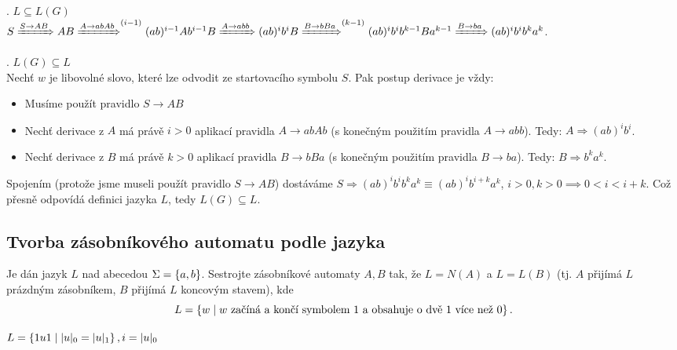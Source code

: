. $L \subseteq L(G)$\\
$S \xRightarrow{S \rightarrow AB} AB \xRightarrow{A \rightarrow abAb}^{(i-1)} (ab)^{i-1} A b^{i-1} B \xRightarrow{A \rightarrow abb}
(ab)^i b^i B \xRightarrow{B \rightarrow bBa}^{(k-1)} (ab)^i b^i b^{k-1} B a^{k-1} \xRightarrow{B \rightarrow ba} (ab)^i b^i b^k a^k$.

. $L(G) \subseteq L$\\
Nechť $w$ je libovolné slovo, které lze odvodit ze startovacího symbolu $S$. Pak postup derivace je vždy:
\begin{itemize}
    \item Musíme použít pravidlo $S \rightarrow AB$
    \item Nechť derivace z $A$ má právě $i > 0$ aplikací pravidla $A \rightarrow abAb$ (s konečným použitím pravidla 
    $A \rightarrow abb$). Tedy: $A \Rightarrow (ab)^i b^i$.
    \item Nechť derivace z $B$ má právě $k > 0$ aplikací pravidla $B \rightarrow bBa$ (s konečným použitím pravidla
    $B \rightarrow ba$). Tedy: $B \Rightarrow b^k a^k$.
\end{itemize}
Spojením (protože jsme museli použít pravidlo $S \rightarrow AB$) dostáváme $S \Rightarrow (ab)^i b^i b^k a^k \equiv 
(ab)^i b^{i+k} a^k$, $i > 0, k > 0 \implies 0 < i < i+k$. Což přesně odpovídá definici jazyka $L$, tedy $L(G) \subseteq L$.

\subsection{Tvorba zásobníkového automatu podle jazyka}
Je dán jazyk $L$ nad abecedou $\Sigma = \left\lbrace a,b \right\rbrace$. Sestrojte zásobníkové automaty $A,B$ tak, že $L = N(A)$ a $L = L(B)$ 
(tj. $A$ přijímá $L$ prázdným zásobníkem, $B$ přijímá $L$ koncovým stavem), kde
\[L = \left\lbrace w \mid w \text{ začíná a končí symbolem } 1 \text{ a obsahuje o dvě } 1 \text{ více než } 0 \right\rbrace\text{.}\]

$L = \left\lbrace 1u1 \mid |u|_0 = |u|_1 \right\rbrace, i = |u|_0$


